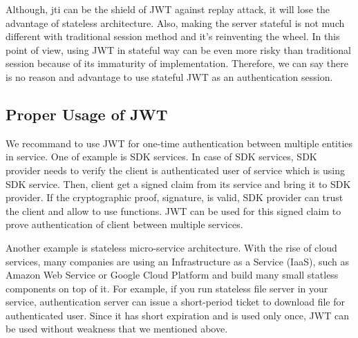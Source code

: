 \documentclass[journal,article,submit,moreauthors,pdftex,10pt,a4paper]{mdpi}
\begin{document}
Although, jti can be the shield of JWT against replay attack, it will lose the advantage of stateless architecture. Also, making the server stateful is not much different with traditional session method and it's reinventing the wheel. In this point of view, using JWT in stateful way can be even more risky than traditional session because of its immaturity of implementation.
Therefore, we can say there is no reason and advantage to use stateful JWT as an authentication session.

\subsection{Proper Usage of JWT}
We recommand to use JWT for one-time authentication between multiple entities in service. One of example is SDK services. In case of SDK services, SDK provider needs to verify the client is authenticated user of service which is using SDK service. Then, client get a signed claim from its service and bring it to SDK provider. If the cryptographic proof, signature, is valid, SDK provider can trust the client and allow to use functions. JWT can be used for this signed claim to prove authentication of client between multiple services.

Another example is stateless micro-service architecture. With the rise of cloud services, many companies are using an Infrastructure as a Service (IaaS), such as Amazon Web Service or Google Cloud Platform and build many small statless components on top of it. For example, if you run stateless file server in your service, authentication server can issue a short-period ticket to download file for authenticated user. Since it has short expiration and is used only once, JWT can be used without weakness that we mentioned above.



\end{document}
